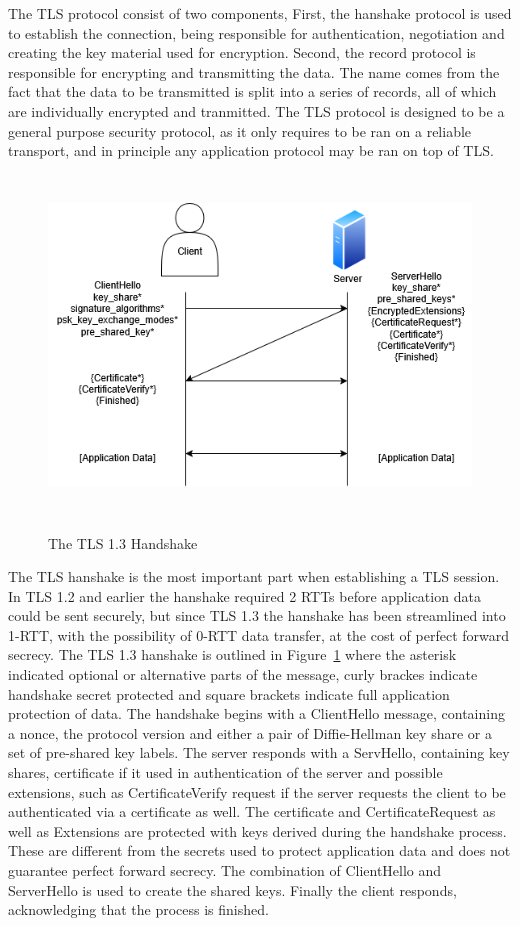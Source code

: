 \documentclass[english, 12pt, a4paper, elec, utf8, a-2b, online]{aaltothesis}
\begin{document}
The TLS protocol consist of two components, First, the hanshake protocol is used to
establish the connection, being responsible for authentication, negotiation and creating
the key material used for encryption. Second, the record protocol is responsible
for encrypting and transmitting the data. The name comes from the fact that the data
to be transmitted is split into a series of records, all of which are individually
encrypted and tranmitted. The TLS protocol is designed to be a general purpose
security protocol, as it only requires to be ran on a reliable transport, and in
principle any application protocol may be ran on top of TLS\cite{rfc8446}.

\begin{figure}[h]
	\centering
	\includegraphics[alt={Diagram of TLS handshake between a client and a server}, height=9cm]{./images/tls_handshake.png}
	\caption{The TLS 1.3 Handshake}
	\label{fig:tls_handshake}
\end{figure}
The TLS hanshake is the most important part when establishing a TLS session. In
TLS 1.2 and earlier the hanshake required 2 RTTs before application data could be sent
securely, but since TLS 1.3 the hanshake has been streamlined into 1-RTT, with the
possibility of 0-RTT data transfer, at the cost of perfect forward secrecy. The TLS 1.3
hanshake is outlined in Figure~\ref{fig:tls_handshake} where the asterisk indicated optional
or alternative parts of the message, curly brackes indicate handshake secret protected and
square brackets indicate full application protection of data. The handshake begins with a ClientHello message,
containing a nonce, the protocol version and
either a pair of Diffie-Hellman key share or a set of pre-shared key labels. The server responds
with a ServHello, containing key shares, certificate if it used in authentication of the server
and possible extensions, such as CertificateVerify request if the server requests the client
to be authenticated via a certificate as well. The certificate and CertificateRequest as
well as Extensions are protected with keys derived during the handshake process. These
are different from the secrets used to protect application data and does not guarantee
perfect forward secrecy. The combination of ClientHello and ServerHello is used to
create the shared keys. Finally the client responds, acknowledging that the process is finished\cite{rfc8446}.
\end{document}
